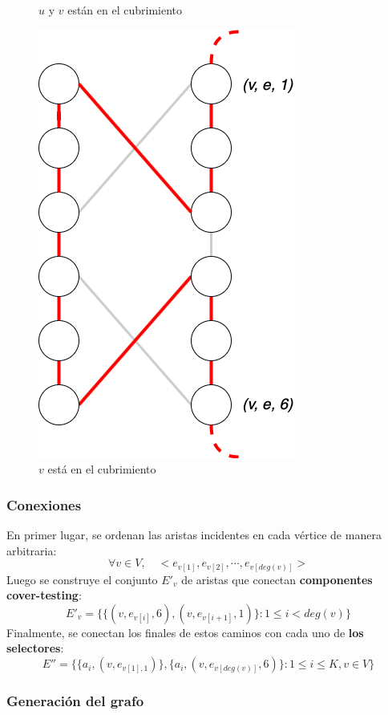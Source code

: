 \documentclass[a4paper]{article}
\begin{document}
\begin{figure}[ht]
\begin{multicols}{3}
\begin{center}
            \caption{$u$ y $v$ están en el cubrimiento}
            \includegraphics[scale=0.2]{images/cover-testing-5.png}
            \caption{$v$ está en el cubrimiento}
    \end{center}
    \end{multicols}
\end{figure}

\subsubsection{Conexiones}

En primer lugar, se ordenan las aristas incidentes en cada vértice de manera arbitraria:
\[\forall v \in V, \quad <e_{v[1]}, e_{v[2]}, \cdots, e_{v[deg(v)]}>\]
Luego se construye el conjunto $E'_v$ de aristas que conectan \textbf{componentes cover-testing}:
\[E'_v = \{\{(v, e_{v[i]}, 6), (v, e_{v[i+1]},1)\} : 1 \le i < deg(v)\}\]
Finalmente, se conectan los finales de estos caminos con cada uno de \textbf{los selectores}:
\[E'' = \{\{a_i, (v,e_{v[1], 1})\},\{a_i, (v,e_{v[deg(v)]}, 6)\} : 1 \le i \le K, v \in V \}\]

\subsubsection{Generación del grafo}
\end{document}
